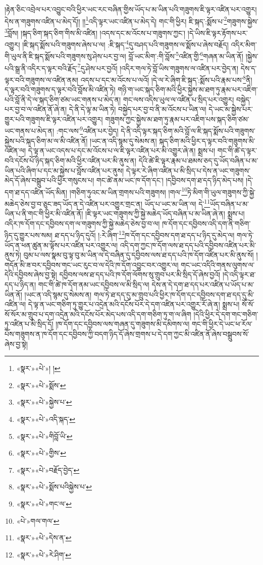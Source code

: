 །རྟེན་ཅིང་འབྲེལ་པར་འབྱུང་བའི་ཕྱིར་ཡང་རང་བཞིན་གྱིས་ཡོད་པ་མ་ཡིན་པའི་གཟུགས་ཇི་ལྟར་འཛིན་པར་འགྱུར། དེས་ན་གཟུགས་འཛིན་པ་མེད་དོ།། །།\footnote{«སྣར་»«པེ་»། །}འདི་ལྟར་ཡང་འཛིན་པ་མེད་དེ། གང་གི་ཕྱིར། ཇི་སྐད་:སྨོས་པ་\footnote{«སྣར་»«པེ་»སྨོས་}གཟུགས་སྐྱེས་\footnote{«སྣར་»«པེ་»སྐྱེས་པ་}བློས། །སྐད་ཅིག་སྐད་ཅིག་གིས་མི་འཛིན། །འདས་དང་མ་འོངས་པ་གཟུགས་ཀྱང་། །དེ་ཡིས་ཇི་ལྟར་རྟོགས་པར་འགྱུར། །ཇི་སྐད་སྨོས་པའི་གཟུགས་ཞེས་པ་ལ། :ཇི་སྐད་\footnote{«སྣར་»«པེ་»འདི་སྐད་}དུ་བཤད་པའི་གཟུགས་ལ་སྨོས་པ་ཞེས་བརྗོད། འདིར་མིག་གི་ཡུལ་ནི་ཇི་སྐད་སྨོས་པའི་གཟུགས་སུ་ཤེས་པར་བྱ་ལ། བློ་ཡང་མིག་:གི་བློས་\footnote{«སྣར་»«པེ་»གིབློ་ཡི་}འཛིན་གྱི་\footnote{«སྣར་»«པེ་»གྱིས་}གཞན་མ་ཡིན་ནོ། །སྐྱེས་པའི་སྒྲ་ནི་འདིར་ད་ལྟར་བའི་རྗོད་\footnote{«སྣར་»«པེ་»བརྗོད་བྱེད་}དུ་ཤེས་པར་བྱའོ། །འདིར་གལ་ཏེ་བློ་ཡིས་གཟུགས་ལ་འཛིན་པར་བྱེད་ན། དེས་ད་ལྟར་བའི་གཟུགས་ལ་འཛིན་ནམ། འདས་པ་དང་མ་འོངས་པ་ལའོ། །དེ་ལ་རེ་ཞིག་ཇི་སྐད་:སྨོས་པའི་རྣམ་པས་\footnote{«སྣར་»«པེ་»སྨོས་པའིསྐྱེས་པ་}ནི། ད་ལྟར་བའི་གཟུགས་ད་ལྟར་བའི་བློས་མི་འཛིན་ཏེ། གཉི་ག་ཡང་སྐད་ཅིག་མའི་ཕྱིར་སྐྱེས་མ་ཐག་ཏུ་རྣམ་པར་འཇིག་པའི་བློ་ནི་དེ་ལ་སྐད་ཅིག་ཙམ་ཡང་གནས་པ་མེད་ན། གང་ལས་འདིས་ཡུལ་ལ་འཛིན་པ་སྲིད་པར་འགྱུར། བསྐྱེད་པར་བྱ་བ་ལ་འཛིན་ནོ་ཞེ་ན། དེ་ནི་དེ་ལྟ་མ་ཡིན་ཏེ། བསྐྱེད་པར་བྱ་བ་ནི་མ་འོངས་པ་ཡིན་ལ། དེ་ཡང་མ་སྐྱེས་པར་གྱུར་པའི་གཟུགས་ཇི་ལྟར་འཛིན་པར་འགྱུར། གཟུགས་ཀྱང་སྐྱེས་མ་ཐག་ཏུ་རྣམ་པར་འཇིག་པས་སྐད་ཅིག་ཙམ་ཡང་གནས་པ་མེད་ན། :གང་ལས་\footnote{«སྣར་»«པེ་»གང་ལ་}འཛིན་པར་བྱེད། དེ་ནི་འདི་ལྟར་སྐད་ཅིག་མའི་བློ་ལ་ཇི་སྐད་སྨོས་པའི་གཟུགས་སྐྱེས་པའི་སྐད་ཅིག་མ་ལ་མི་འཛིན་ནོ། །ཡང་ན་འདི་སྙམ་དུ་སེམས་ན། སྐད་ཅིག་མའི་ཕྱིར་ད་ལྟར་བའི་གཟུགས་མི་འཛིན་ལ། དེ་ལྟ་ན་ཡང་འདས་པ་དང་མ་འོངས་པ་ལ་ཇི་ལྟར་འཛིན་པར་མི་འགྱུར་ཞེ་ན། སྨྲས་པ། གང་གི་ཚེ་ད་ལྟར་བའི་དངོས་པོ་ཉིད་སྐད་ཅིག་མའི་ཕྱིར་འཛིན་པར་མི་ནུས་ན། དེའི་ཚེ་ཇི་ལྟར་རྣམ་པ་ཐམས་ཅད་དུ་ཡོད་བཞིན་པ་མ་ཡིན་པའི་ཞིག་པ་དང་མ་སྐྱེས་པ་བློས་འཛིན་པར་ནུས། དེ་ལྟར་རེ་ཞིག་འཛིན་པ་མི་སྲིད་པ་དེས་ན་ཡང་གཟུགས་མེད་དོ་ཞེས་བསྒྲུབ་པའི་ཕྱིར་གསུངས་པ། གང་ཚེ་ནམ་ཡང་ཁ་དོག་དང་། །དབྱིབས་དག་ཐ་དད་ཉིད་མེད་པས། །དེ་དག་ཐ་དད་འཛིན་ཡོད་མིན། །གཅིག་ཏུའང་མ་ཡིན་གྲགས་པའི་གཟུགས། །གལ་\footnote{«པེ་»གལ་གལ་}ཏེ་མིག་གི་ཡུལ་གཟུགས་ཀྱི་སྐྱེ་མཆེད་ཅེས་བྱ་བ་ཅུང་ཟད་ཡོད་ན་དེ་འཛིན་པར་འགྱུར་གྲང་ན། ཡོད་པ་ཡང་མ་ཡིན་ལ། དེ་\footnote{«སྣར་»«པེ་»དེས་ན་}ཡོད་བཞིན་པ་མ་ཡིན་པ་ནི་གང་གི་ཕྱིར་མི་འཛིན་ནོ། །ཇི་ལྟར་ཡང་གཟུགས་ཀྱི་སྐྱེ་མཆེད་ཡོད་བཞིན་པ་མ་ཡིན་ཞེ་ན། སྨྲས་པ། འདིར་ཁ་དོག་དང་དབྱིབས་དག་ལ་གཟུགས་ཀྱི་སྐྱེ་མཆེད་ཅེས་བྱ་བ་ལ། ཁ་དོག་དང་དབྱིབས་འདི་དག་ནི་གཅིག་ཉིད་དུ་གྱུར་པས་སམ། ཐ་དད་པ་ཉིད་དུའོ། །:རེ་ཞིག་\footnote{«སྣར་»«པེ་»རེ་ཤིག་}ཁ་དོག་དང་དབྱིབས་དག་ཐ་དད་པ་ཉིད་དུ་མེད་ལ། གལ་ཏེ་ཡོད་ན་ཕན་ཚུན་མ་ལྟོས་པར་འཛིན་པར་འགྱུར་ལ། འདི་དག་ཀྱང་ཁ་དོག་ལས་ཐ་དད་པའི་དབྱིབས་འཛིན་པར་མི་ནུས་ཏེ། བུམ་པ་ལས་སྣམ་བུ་ལྟ་བུ་མ་ཡིན་ལ་དེ་བཞིན་དུ་དབྱིབས་ལས་ཐ་དད་པའི་ཁ་དོག་འཛིན་པར་མི་ནུས་སོ། །གདོན་མི་ཟ་བར་དབྱིབས་གང་ཡང་རུང་བ་ལ་དེའི་ཁ་དོག་འབྱུང་བར་འགྱུར་ལ། གང་ཡང་འདིའི་གནས་ལུགས་ལ་དེའི་དབྱིབས་ཞེས་བྱ་སྟེ། དབྱིབས་ལས་ཐ་དད་པའི་ཁ་དོག་ལོགས་སུ་གྲུབ་པར་མི་སྲིད་དོ་ཞེས་བྱའོ། །དེ་འདི་ལྟར་ཐ་དད་པ་ཉིད་ན། གང་གི་ཚེ་ཁ་དོག་ནམ་ཡང་དབྱིབས་ལ་མི་སྲིད་ལ། དེས་ན་དེ་དག་ཐ་དད་པར་འཛིན་པ་ཡོད་པ་མ་ཡིན་ནོ། །ཡང་ན་འདི་སྙམ་དུ་སེམས་ན། གལ་ཏེ་ཐ་དད་དུ་མ་གྲུབ་པའི་ཕྱིར་ཁ་དོག་དང་དབྱིབས་དག་ཐ་དད་དུ་མི་འཛིན་ལ། དེ་ལྟ་ན་ཡང་གཅིག་ཏུ་གྱུར་པ་འདྲེན་མའི་དངོས་པོར་དེ་དག་འཛིན་པར་འགྱུར་རོ་ཞེ་ན། སྨྲས་པ། སོ་སོ་སོ་སོར་མ་གྲུབ་པ་དག་འདྲེན་མའི་དངོས་པོར་མེད་པས་འདི་དག་གཅིག་ཏུ་ག་ལ་ཞིག །དེའི་ཕྱིར་དེ་དག་གང་གཅིག་ཏུ་འཛིན་པ་མི་སྲིད་དོ། །ཁ་དོག་དང་དབྱིབས་ལས་གཞན་དུ་གཟུགས་མི་དམིགས་ལ། གང་གི་ཕྱིར་དེ་ཡང་ཕ་རོལ་པོས་གཟུགས་ན་ཁ་དོག་དང་དབྱིབས་ཀྱི་བདག་ཉིད་དོ་ཞེས་གྲགས་པ་དེ་དག་ཀྱང་མི་འཛིན་ནོ་ཞེས་བསྒྲུབས་སོ་ཞེས་བྱ་སྟེ། 
